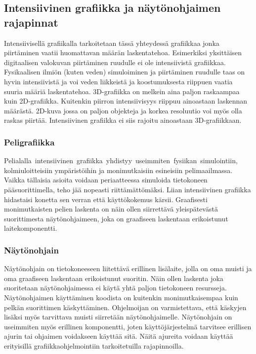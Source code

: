 \subsection{Intensiivinen grafiikka ja näytönohjaimen rajapinnat}
Intensiivisellä grafiikalla tarkoitetaan tässä yhteydessä grafiikkaa jonka piirtäminen vaatii huomattavan määrän laskentatehoa. Esimerkiksi yksittäisen digitaalisen valokuvan piirtäminen ruudulle ei ole intensiivistä grafiikkaa. Fysikaalisen ilmiön (kuten veden) simuloiminen ja piirtäminen ruudulle taas on hyvin intensiivistä ja voi veden liikkeistä ja koostumuksesta riippuen vaatia suuria määriä laskentatehoa. 3D-grafiikka on melkein aina paljon raskaampaa kuin 2D-grafiikka. Kuitenkin piirron intensiivisyys riippuu ainoastaan laskennan määrästä. 2D-kuva jossa on paljon objekteja ja korkea resoluutio voi myös olla raskas piirtää. Intensiivinen grafiikka ei siis rajoitu ainoastaan 3D-grafiikkaan.

\subsubsection{Peligrafiikka}
\mbox{Pelialalla intensiivinen grafiikka yhdistyy useimmiten fysiikan simulointiin}, kolmiuloitteisiin ympäristöihin ja monimutkaisiin esineisiin pelimaailmassa. Vaikka tällaisia asioita voidaan periaatteessa simuloida tietokoneen pääsuorittimella, teho jää nopeasti riittämättömäksi. Liian intensiivinen grafiikka hidastaisi konetta sen verran että käyttökokemus kärsii. Graafisesti monimutkaisten pelien laskenta on näin ollen siirrettävä yleispätevästä suorittimesta näytönohjaimeen, joka on graafiseen laskentaan erikoistunut laitekomponentti.

\subsubsection{Näytönohjain}
Näytönohjain on tietokoneeseen liitettävä erillinen lisälaite, jolla on oma muisti ja oma graafiseen laskentaan erikoistunut suoritin. Näin ollen laskenta joka suoritetaan näytönohjaimessa ei käytä yhtä paljon tietokoneen resursseja. Näytönohjaimen käyttäminen koodista on kuitenkin monimutkaisempaa kuin pelkän suorittimen käskyttäminen. Ohjelmoijan on varmistettava, että käskyjen lisäksi myös tarvittava muisti siirretään näytönohjaimelle. Näytönohjain on useimmiten myös erillinen komponentti, joten käyttöjärjestelmä tarvitsee erillisen ajurin tai ohjaimen voidakseen käyttää sitä. Näitä ajureita voidaan käyttää erityisillä grafiikkaohjelmointiin tarkoitetuilla rajapinnoilla.

